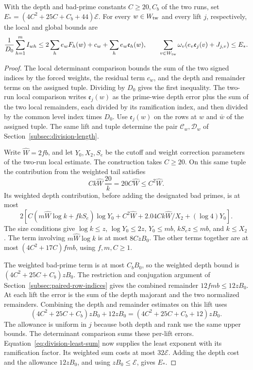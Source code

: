 \begin{lemma}\label{lem:aux-transport-cost}
With the depth and bad-prime constants \(C\ge20,C_b\) of the two
runs, set \(E_*=(4C^2+25C+C_b+44)\mathcal E\).
For every \(w\in W_{\rm tw}\) and every lift \(j\), respectively,
the local and global bounds are
\[
 \frac{1}{D_0}\sum_{h=1}^m I_{wh}
       \le 2\sum_h e_w F_h(w)+c_w+\sum_h e_w\mathfrak e_h(w),
 \qquad
 \sum_{v\in W_{\rm tw}}\omega_v(e_v\mathfrak e_j(v)+J_{j,v})\le E_* .
\]
\end{lemma}

\begin{proof}
The local determinant comparison bounds the sum of the two signed
indices by the forced weights, the residual term \(c_w\), and the depth
and remainder terms on the assigned tuple. Dividing by \(D_0\) gives
the first inequality.
The two-run local comparison writes \(\mathfrak e_j(w)\)
as the prime-wise depth error plus the sum of the two local
remainders, each divided by its ramification index, and then
divided by the common level index times \(D_0\).
Use \(\mathfrak e_j(w)\) on the rows at \(w\) and \(\bar w\)
of the assigned tuple. The same lift and tuple determine
the pair \(\mathcal C_w,\mathcal D_w\) of Section~\ref{subsec:division-length}.

Write \(\widehat W=2fb\), and let \(Y_0,X_2,S_e\)
be the cutoff and weight correction parameters of the
two-run local estimate. The construction takes \(C\ge20\).
On this same tuple the contribution from the weighted tail satisfies
\[
  Ck\widehat W\,\frac{20}{k}=20C\widehat W\le C^2\widehat W.
\]
 Its weighted depth contribution,
before adding the designated bad primes, is at most
\[
 2\left[
 C(m\widehat W\log k+fkS_e)\log Y_0+C^2\widehat W
 +2.04 C k\widehat W/X_2+(\log4)Y_0\right].
\]
The size conditions give \(\log k\le z\),
\(\log Y_0\le2z\), \(Y_0\le mb\), \(kS_ez\le mb\),
and \(k\le X_2\). The term involving \(m\widehat W\log k\)
is at most \(8CzB_0\). The other terms together are at most
\((4C^2+17C)fmb\), using \(f,m,C\ge1\).

The weighted bad-prime term is at most \(C_b B_0\),
so the weighted depth bound is \((4C^2+25C+C_b)zB_0\).
The restriction and conjugation argument of
Section~\ref{subsec:paired-row-indices} gives the combined
remainder \(12fmb\le12zB_0\).
At each lift the error is the sum of the depth majorant and the two normalized remainders.
Combining the depth and remainder estimates on this lift uses
\[
  (4C^2+25C+C_b)zB_0+12zB_0=(4C^2+25C+C_b+12)zB_0 .
\]
 The allowance is
uniform in \(j\) because both depth and rank use the same upper
bounds. The determinant comparison sums these per-lift errors.
Equation~\eqref{eq:division-least-sum} now supplies the
least exponent with its ramification factor. Its weighted sum costs
at most \(32\mathcal E\). Adding the depth cost and the allowance
\(12zB_0\), and using \(zB_0\le\mathcal E\), gives \(E_*\).
\end{proof}

